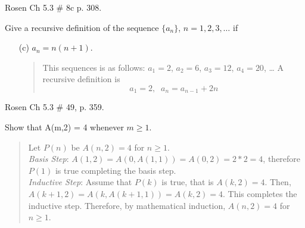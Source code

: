 \documentclass[11pt]{exam}
\begin{document}
\begin{questions}
\question Rosen Ch 5.3 \# 8c p. 308.
\begin{solution}
Give a recursive definition of the sequence $\{a_n\}$, $n=1,2,3,
\ldots$ if
\begin{itemize}
    \item[(c)] $a_n = n(n+1)$.
    \begin{quote}
        This sequences is as follows: $a_1 = 2$, $a_2 = 6$, $a_3 = 12$, $a_4 = 20$, \ldots
        A recursive definition is
        \[ a_1 = 2, \;\; a_{n} = a_{n-1} + 2n \]
    \end{quote}
\end{itemize}
\end{solution}


\question Rosen Ch 5.3 \# 49, p. 359.
\begin{solution}
 Show that A(m,2) = 4 whenever
$m \geq 1$.
\begin{quote}
    Let $P(n)$ be $A(n,2) = 4$ for $n \geq 1$. \\
    \textit{Basis Step}: $A(1,2) = A(0,A(1,1)) = A(0,2) = 2*2 = 4$, therefore $P(1)$ is true completing the basis step. \\
    \textit{Inductive Step}: Assume that $P(k)$ is true, that is $A(k,2) = 4$.  Then, $A(k+1,2) = A(k,A(k+1,1)) = A(k,2) = 4$.  This completes the inductive step.  Therefore, by mathematical induction, $A(n,2) = 4$ for $n \geq 1$.
\end{quote}
\end{solution}

\end{questions}
\end{document}
